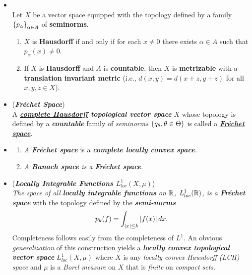 \documentclass[11pt]{article}
\begin{document}
\begin{itemize}
\item \begin{proposition}\citep{folland2013real}\\
Let $X$ be a vector space equipped with the topology defined by a family $\left\{p_{\alpha}\right\}_{\alpha\in A}$ of \textbf{seminorms}.
\begin{enumerate}
\item $X$ is \textbf{Hausdorff} if and only if for each $x \neq 0$ there exists $\alpha \in A$ such that $p_{\alpha}(x) \neq 0$.
\item If $X$ is \textbf{Hausdorff} and $A$ is \textbf{countable}, then $X$ is \textbf{metrizable} with a \textbf{translation invariant metric} (i.e., $d(x, y) = d(x +z, y+ z)$ for all $x, y, z \in X$).
\end{enumerate}
\end{proposition}

\item \begin{definition} (\emph{\textbf{Fr{\'e}chet Space}})\\
A \emph{\textbf{\underline{complete Hausdorff} topological vector space}} $X$ whose topology is defined by a \textbf{\emph{countable}} family of \emph{seminorms} $\left\{q_{\theta},\theta\in \Theta\right\}$ is called a \underline{\emph{\textbf{Fr{\'e}chet space}}}.
\end{definition}

\item \begin{example}
\begin{enumerate}
\item \emph{A \textbf{Fr{\'e}chet space}} is a \emph{\textbf{complete locally convex space}}. 

\item \emph{A \textbf{Banach space} is a \textbf{Fr{\'e}chet space}}.
\end{enumerate}
\end{example}

\item \begin{example} (\emph{\textbf{Locally Integrable Functions $L_{loc}^{1}(X, \mu)$}})\\
\emph{The space of all \textbf{locally integrable functions} on ${\mathbb R}$, $L_{loc}^{1}({\mathbb R})$, is a \textbf{Fr{\'e}chet space}} with the topology defined by the \emph{\textbf{semi-norms}}
\begin{align*}
 p_{k}(f) = \int_{\left\lvert x \right\rvert \le k} \left\lvert f(x) \right\rvert dx.
\end{align*}
Completeness follows easily from the completeness of $L^1$.  An obvious \emph{generalization} of this construction yields a \emph{\textbf{locally convex topological vector space}}  $L_{loc}^{1}(X, \mu)$ where $X$ is any \emph{locally convex Hausdorff (LCH) space} and $\mu$ is a \emph{Borel measure} on $X$ that is \emph{finite} on \emph{compact sets}.
\end{example}
\end{itemize}



\newpage


\end{document}

